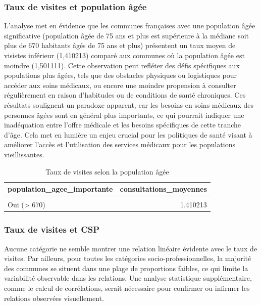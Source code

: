 \documentclass[
]{article}
\begin{document}
\hypertarget{taux-de-visites-et-population-uxe2guxe9e}{%
\subsubsection{Taux de visites et population
âgée}\label{taux-de-visites-et-population-uxe2guxe9e}}

L'analyse met en évidence que les communes françaises avec une
population âgée significative (population âgée de 75 ans et plus est
supérieure à la médiane soit plus de 670 habitants âgés de 75 ans et
plus) présentent un taux moyen de visistes inférieur (1,410213) comparé
aux communes où la population âgée est moindre (1,501111). Cette
observation peut refléter des défis spécifiques aux populations plus
âgées, tels que des obstacles physiques ou logistiques pour accéder aux
soins médicaux, ou encore une moindre propension à consulter
régulièrement en raison d'habitudes ou de conditions de santé
chroniques. Ces résultats soulignent un paradoxe apparent, car les
besoins en soins médicaux des personnes âgées sont en général plus
importants, ce qui pourrait indiquer une inadéquation entre l'offre
médicale et les besoins spécifiques de cette tranche d'âge. Cela met en
lumière un enjeu crucial pour les politiques de santé visant à améliorer
l'accès et l'utilisation des services médicaux pour les populations
vieillissantes.

\begin{table}[H]
\centering
\caption{\label{tab:unnamed-chunk-9}Taux de visites selon la population âgée}
\centering
\begin{tabular}[t]{lr}
\toprule
population\_agee\_importante & consultations\_moyennes\\
\midrule
\cellcolor{gray!10}{Non (<= 670)} & \cellcolor{gray!10}{1.501111}\\
Oui (> 670) & 1.410213\\
\bottomrule
\end{tabular}
\end{table}

\hypertarget{taux-de-visites-et-csp}{%
\subsubsection{Taux de visites et CSP}\label{taux-de-visites-et-csp}}

Aucune catégorie ne semble montrer une relation linéaire évidente avec
le taux de visites. Par ailleurs, pour toutes les catégories
socio-professionnelles, la majorité des communes se situent dans une
plage de proportions faibles, ce qui limite la variabilité observable
dans les relations. Une analyse statistique supplémentaire, comme le
calcul de corrélations, serait nécessaire pour confirmer ou infirmer les
relations observées visuellement.
\end{document}
